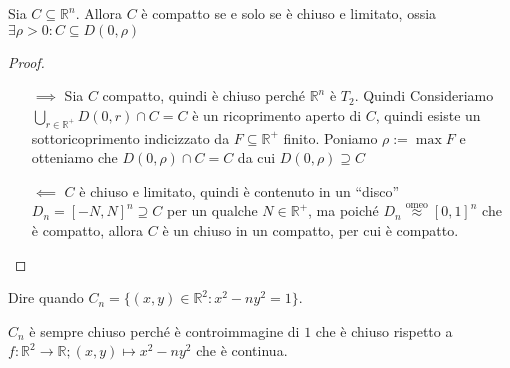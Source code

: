 \begin{theorem}
    Sia \(C \subseteq \mathbb{R}^{n}\). Allora \(C\) è compatto se e solo se è
    chiuso e limitato, ossia \(\exists \rho > 0 : C \subseteq D(0, \rho) \) 
\end{theorem}
\begin{proof}\( \)
\begin{itemize}
    \item[\(\implies \)] Sia \(C\) compatto, quindi è chiuso perché
        \(\mathbb{R}^{n}\) è \(T_{2}\). Quindi Consideriamo \(\bigcup_{r \in
        \mathbb{R}^{+}} D(0, r) \cap C = C \) è un ricoprimento aperto di \(C\),
        quindi esiste un sottoricoprimento indicizzato da \(F \subseteq
        \mathbb{R}^{+} \) finito. Poniamo \(\rho := \max F\) e otteniamo che
        \(D(0, \rho) \cap C = C\) da cui \(D(0, \rho) \supseteq C  \) 
    \item[\(\impliedby \)] \(C\) è chiuso e limitato, quindi è contenuto in un
        ``disco'' \(D_n = [-N, N]^{n} \supseteq C \) per un qualche \(N \in
        \mathbb{R}^{+}\), ma poiché \(D_n \stackrel{\text{omeo}}{\approx} [0, 1]^{n}
        \) che è compatto, allora \(C\) è un chiuso in un compatto, per cui è
        compatto.
\end{itemize}
\end{proof}
\begin{example}
    Dire quando \(C_n = \{(x, y) \in \mathbb{R}^{2} : x^2 - ny^2 = 1\} \).

    \(C_n\) è sempre chiuso perché è controimmagine di \(1\) che è chiuso
    rispetto a \(f: \mathbb{R}^{2} \to \mathbb{R}; (x, y) \mapsto x^2 - ny^2\)
    che è continua.
\end{example}


